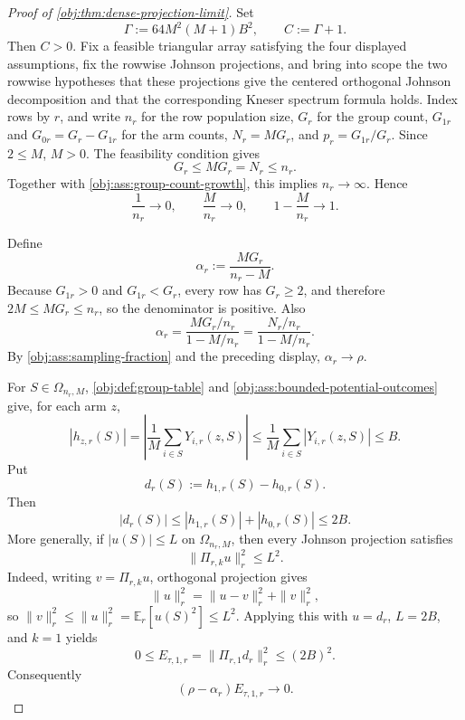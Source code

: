 \begin{proof}[Proof of \cref{obj:thm:dense-projection-limit}]
Set
\[
\Gamma:=64M^2(M+1)B^2,
\qquad
C:=\Gamma+1 .
\]
Then \(C>0\).  Fix a feasible triangular array satisfying the four displayed assumptions, fix the rowwise Johnson projections, and bring into scope the two rowwise hypotheses that these projections give the centered orthogonal Johnson decomposition and that the corresponding Kneser spectrum formula holds.  Index rows by \(r\), and write \(n_r\) for the row population size, \(G_r\) for the group count, \(G_{1r}\) and \(G_{0r}=G_r-G_{1r}\) for the arm counts, \(N_r=MG_r\), and \(p_r=G_{1r}/G_r\).  Since \(2\le M\), \(M>0\).  The feasibility condition gives
\[
G_r\le MG_r=N_r\le n_r .
\]
Together with \cref{obj:ass:group-count-growth}, this implies \(n_r\to\infty\).  Hence
\[
\frac1{n_r}\to0,\qquad
\frac{M}{n_r}\to0,\qquad
1-\frac{M}{n_r}\to1 .
\]

Define
\[
\alpha_r:=\frac{MG_r}{n_r-M}.
\]
Because \(G_{1r}>0\) and \(G_{1r}<G_r\), every row has \(G_r\ge2\), and therefore \(2M\le MG_r\le n_r\), so the denominator is positive.  Also
\[
\alpha_r
=
\frac{MG_r/n_r}{1-M/n_r}
=
\frac{N_r/n_r}{1-M/n_r}.
\]
By \cref{obj:ass:sampling-fraction} and the preceding display, \(\alpha_r\to\rho\).

For \(S\in\Omega_{n_r,M}\), \cref{obj:def:group-table} and \cref{obj:ass:bounded-potential-outcomes} give, for each arm \(z\),
\[
|h_{z,r}(S)|
=
\left|
\frac1M\sum_{i\in S}Y_{i,r}(z,S)
\right|
\le
\frac1M\sum_{i\in S}|Y_{i,r}(z,S)|
\le B .
\]
Put
\[
d_r(S):=h_{1,r}(S)-h_{0,r}(S).
\]
Then
\[
|d_r(S)|\le |h_{1,r}(S)|+|h_{0,r}(S)|\le 2B .
\]
More generally, if \(|u(S)|\le L\) on \(\Omega_{n_r,M}\), then every Johnson projection satisfies
\[
\|\Pi_{r,k}u\|_r^2\le L^2 .
\]
Indeed, writing \(v=\Pi_{r,k}u\), orthogonal projection gives
\[
\|u\|_r^2=\|u-v\|_r^2+\|v\|_r^2,
\]
so \(\|v\|_r^2\le \|u\|_r^2=\mathbb E_r[u(S)^2]\le L^2\).  Applying this with \(u=d_r\), \(L=2B\), and \(k=1\) yields
\[
0\le E_{\tau,1,r}
=
\|\Pi_{r,1}d_r\|_r^2
\le (2B)^2 .
\]
Consequently
\[
(\rho-\alpha_r)E_{\tau,1,r}\to0 .
\]


\end{proof}
